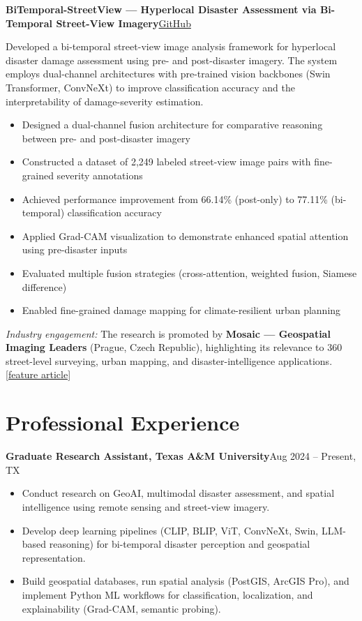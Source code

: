 \documentclass[10pt,letterpaper]{article}
\newcommand{\entry}[2]{%
  \par\vspace{0.30em}\noindent\textbf{#1}\hfill{\small #2}\par}
\newenvironment{tight}
  {\begin{itemize}[leftmargin=1.25em,itemsep=0.10em,topsep=0.20em,parsep=0pt,label=\textbullet]}
  {\end{itemize}}
\begin{document}
\entry{BiTemporal-StreetView --- Hyperlocal Disaster Assessment via Bi-Temporal Street-View Imagery}{\href{https://github.com/rayford295/Bi-Temporal-StreetView}{GitHub}}
\vspace{0.15em}
Developed a bi-temporal street-view image analysis framework for hyperlocal disaster damage assessment using pre- and post-disaster imagery. The system employs dual-channel architectures with pre-trained vision backbones (Swin Transformer, ConvNeXt) to improve classification accuracy and the interpretability of damage-severity estimation.
\begin{tight}
  \item Designed a dual-channel fusion architecture for comparative reasoning between pre- and post-disaster imagery
  \item Constructed a dataset of 2,249 labeled street-view image pairs with fine-grained severity annotations
  \item Achieved performance improvement from 66.14\% (post-only) to 77.11\% (bi-temporal) classification accuracy
  \item Applied Grad-CAM visualization to demonstrate enhanced spatial attention using pre-disaster inputs
  \item Evaluated multiple fusion strategies (cross-attention, weighted fusion, Siamese difference)
  \item Enabled fine-grained damage mapping for climate-resilient urban planning
\end{tight}
\vspace{0.25em}
\textit{Industry engagement:} The research is promoted by \textbf{Mosaic --- Geospatial Imaging Leaders} (Prague, Czech Republic), highlighting its relevance to 360\textdegree{} street-level surveying, urban mapping, and disaster-intelligence applications. \href{https://www.mosaic51.com/featured/how-texas-am-is-pioneering-damage-assessment-using-mosaic-imagery-from-hurricane-milton/}{[feature article]}

\section{Professional Experience}

\entry{Graduate Research Assistant, Texas A\&M University}{Aug 2024 -- Present, TX}
\begin{tight}
  \item Conduct research on GeoAI, multimodal disaster assessment, and spatial intelligence using remote sensing and street-view imagery.
  \item Develop deep learning pipelines (CLIP, BLIP, ViT, ConvNeXt, Swin, LLM-based reasoning) for bi-temporal disaster perception and geospatial representation.
  \item Build geospatial databases, run spatial analysis (PostGIS, ArcGIS Pro), and implement Python ML workflows for classification, localization, and explainability (Grad-CAM, semantic probing).
\end{tight}
\end{document}
